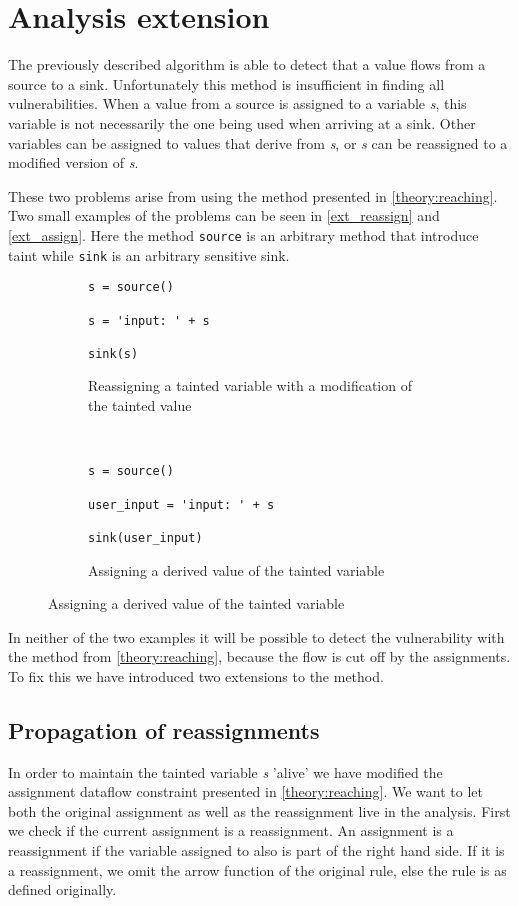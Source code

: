 \section{Analysis extension}
The previously described algorithm is able to detect that a value flows from a source to a sink.
Unfortunately this method is insufficient in finding all vulnerabilities.
When a value from a source is assigned to a variable \textit{s}, this variable is not necessarily the one being used when arriving at a sink.
Other variables can be assigned to values that derive from \textit{s}, or \textit{s} can be reassigned to a modified version of \textit{s}.

These two problems arise from using the method presented in \cref{theory:reaching}.
Two small examples of the problems can be seen in \cref{ext_reassign} and \cref{ext_assign}.
Here the method \texttt{source} is an arbitrary method that introduce taint while \texttt{sink} is an arbitrary sensitive sink.

\begin{figure}

  \begin{subfigure}[b]{0.45\textwidth}
    \begin{lstlisting}[style=python]
s = source()

s = 'input: ' + s

sink(s)
    \end{lstlisting}
    \caption{Reassigning a tainted variable with a modification of the tainted value}
    \label{ext:reassign}
  \end{subfigure}
  ~~
  \begin{subfigure}[b]{0.45\textwidth}
    \begin{lstlisting}[style=python, numbers=none]
s = source()

user_input = 'input: ' + s

sink(user_input)
    \end{lstlisting}
    \caption{Assigning a derived value of the tainted variable}
    \label{ext:assign}
  \end{subfigure}
\end{figure}

In neither of the two examples it will be possible to detect the vulnerability with the method from \cref{theory:reaching}, because the flow is cut off by the assignments.
To fix this we have introduced two extensions to the method.

\subsection{Propagation of reassignments}
In order to maintain the tainted variable \textit{s} 'alive' we have modified the assignment dataflow constraint presented in \cref{theory:reaching}.
We want to let both the original assignment as well as the reassignment live in the analysis.
First we check if the current assignment is a reassignment.
An assignment is a reassignment if the variable assigned to also is part of the right hand side.
If it is a reassignment, we omit the arrow function of the original rule, else the rule is as defined originally.

